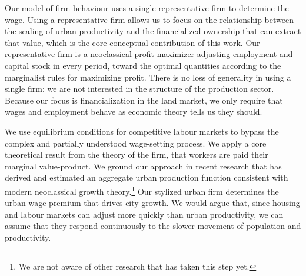 Our model of firm behaviour uses a single representative firm to determine the wage. Using a representative firm allows us to focus on the relationship between the scaling of urban productivity and the financialized ownership that can extract that value, which is the core conceptual contribution of this work. Our representative firm is a neoclassical profit-maximizer adjusting employment and capital stock in every period, toward the optimal quantities according to the marginalist rules for maximizing profit. There is no loss of generality in using a single firm: we are not interested in the structure of the production sector. Because our focus is financialization in the land market, we only require that wages and employment behave as economic theory tells us they should. 

 We use equilibrium conditions for competitive labour markets to bypass the complex and partially understood wage-setting process. We apply a core theoretical result from the theory of the firm, that workers are paid their \gls{marginal value-product}. We ground our approach in recent research that has derived and estimated an aggregate urban production function consistent with modern \gls{neoclassical growth theory}.\footnote{We are not aware of other research that has taken this step yet.} Our stylized urban firm determines the urban wage premium that drives city growth. We would argue that, since housing and labour markets can adjust more quickly than urban productivity, we can assume that they respond continuously to the slower movement of population and productivity. %









